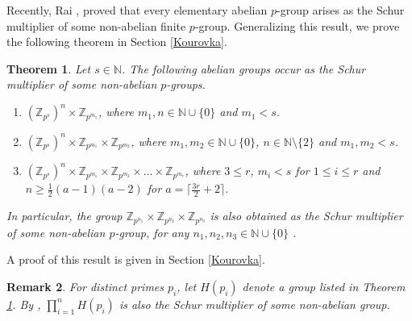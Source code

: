 \documentclass[preprint,sort&compress,12pt]{elsarticle}
\newtheorem{theorem}{Theorem}[section]
\newtheorem{remark}[theorem]{Remark}
\numberwithin{equation}{section}
\theoremstyle{definition}
\newcommand{\Z}{\mathbb{Z}}
\newcommand{\sabnam}[1]{{\color{red} #1}}
\begin{document}
\medskip
Recently, Rai \cite[Theorem 6]{Rai2023}, proved that every elementary abelian \(p\)-group arises as the Schur multiplier of some
non-abelian finite \(p\)-group. Generalizing this result, we prove the following
theorem in Section \ref{Kourovka}.
\begin{theorem}\label{Application_Kourovka}
    Let $s\in \mathbb{N}$. The following abelian groups occur as the Schur multiplier of some non-abelian $p$-groups.
    \begin{enumerate}

       \item [(i)]$ (\Z_{p^s})^n \times \Z_{p^{m_1}}$, where $m_1,n \in \mathbb{N} \cup \{0\}$ and $ m_1 < s $.
    \item [(ii)] $(\Z_{p^s})^n \times \Z_{p^{m_1}} \times \Z_{p^{m_2}} $, where $m_1,m_2 \in \mathbb{N} \cup \{0\}$, $n \in \mathbb{N} \setminus \{2\}$ and $ m_1,m_2 < s $.
    \item [(iii)]  $(\Z_{p^s})^n \times \Z_{p^{m_1}} \times \Z_{p^{m_2}} \times \ldots \times \Z_{p^{m_r}} $, where $3 \leq r $,  $m_i < s$ for $1 \le i \le r$ and $n \ge \frac{1}{2}(a-1)(a-2)$ for $a=\lceil\frac{3r}{2}+2\rceil$.
    \end{enumerate}
    In particular, the group $\Z_{p^{n_1}} \times \Z_{p^{n_2}} \times \Z_{p^{n_3}}$ is also obtained as the Schur multiplier of some non-abelian $p$-group, for any $n_1,n_2,n_3 \in  \mathbb{N} \cup \{0\}$ .
\end{theorem}
A proof of this result is given in Section \ref{Kourovka}.
\begin{remark}
For distinct primes $p_i$, let $H(p_i)$ denote a group listed in Theorem \ref{Application_Kourovka}. By \cite[Theorem 2.2.10]{Karp1987}, $\prod_{i=1}^{n}H({p_i})$ is also the Schur multiplier of some non-abelian group.

    \end{remark}
\end{document}
